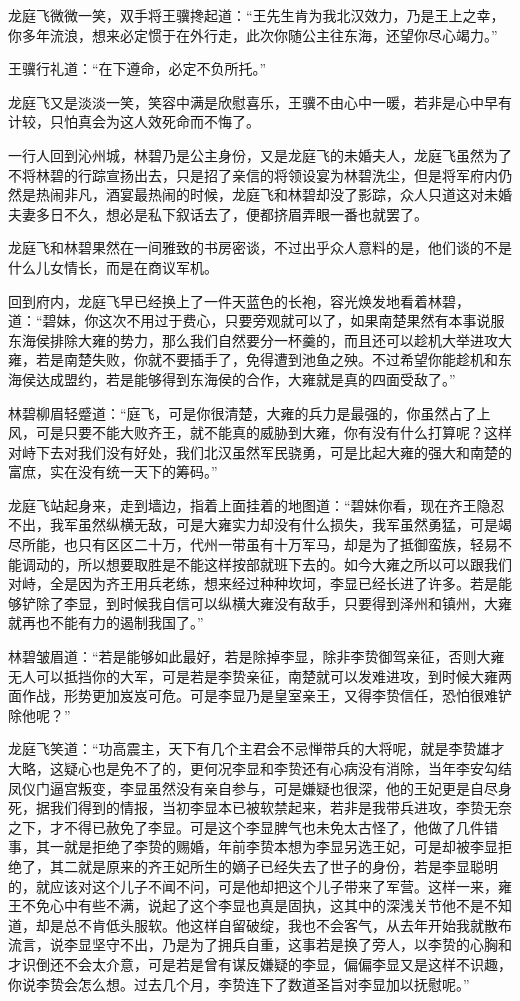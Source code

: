 龙庭飞微微一笑，双手将王骥搀起道：“王先生肯为我北汉效力，乃是王上之幸，你多年流浪，想来必定惯于在外行走，此次你随公主往东海，还望你尽心竭力。”

王骥行礼道：“在下遵命，必定不负所托。”

龙庭飞又是淡淡一笑，笑容中满是欣慰喜乐，王骥不由心中一暖，若非是心中早有计较，只怕真会为这人效死命而不悔了。

一行人回到沁州城，林碧乃是公主身份，又是龙庭飞的未婚夫人，龙庭飞虽然为了不将林碧的行踪宣扬出去，只是招了亲信的将领设宴为林碧洗尘，但是将军府内仍然是热闹非凡，酒宴最热闹的时候，龙庭飞和林碧却没了影踪，众人只道这对未婚夫妻多日不久，想必是私下叙话去了，便都挤眉弄眼一番也就罢了。

龙庭飞和林碧果然在一间雅致的书房密谈，不过出乎众人意料的是，他们谈的不是什么儿女情长，而是在商议军机。

回到府内，龙庭飞早已经换上了一件天蓝色的长袍，容光焕发地看着林碧，道：“碧妹，你这次不用过于费心，只要旁观就可以了，如果南楚果然有本事说服东海侯排除大雍的势力，那么我们自然要分一杯羹的，而且还可以趁机大举进攻大雍，若是南楚失败，你就不要插手了，免得遭到池鱼之殃。不过希望你能趁机和东海侯达成盟约，若是能够得到东海侯的合作，大雍就是真的四面受敌了。”

林碧柳眉轻蹙道：“庭飞，可是你很清楚，大雍的兵力是最强的，你虽然占了上风，可是只要不能大败齐王，就不能真的威胁到大雍，你有没有什么打算呢？这样对峙下去对我们没有好处，我们北汉虽然军民骁勇，可是比起大雍的强大和南楚的富庶，实在没有统一天下的筹码。”

龙庭飞站起身来，走到墙边，指着上面挂着的地图道：“碧妹你看，现在齐王隐忍不出，我军虽然纵横无敌，可是大雍实力却没有什么损失，我军虽然勇猛，可是竭尽所能，也只有区区二十万，代州一带虽有十万军马，却是为了抵御蛮族，轻易不能调动的，所以想要取胜是不能这样按部就班下去的。如今大雍之所以可以跟我们对峙，全是因为齐王用兵老练，想来经过种种坎坷，李显已经长进了许多。若是能够铲除了李显，到时候我自信可以纵横大雍没有敌手，只要得到泽州和镇州，大雍就再也不能有力的遏制我国了。”

林碧皱眉道：“若是能够如此最好，若是除掉李显，除非李贽御驾亲征，否则大雍无人可以抵挡你的大军，可是若是李贽亲征，南楚就可以发难进攻，到时候大雍两面作战，形势更加岌岌可危。可是李显乃是皇室亲王，又得李贽信任，恐怕很难铲除他呢？”

龙庭飞笑道：“功高震主，天下有几个主君会不忌惮带兵的大将呢，就是李贽雄才大略，这疑心也是免不了的，更何况李显和李贽还有心病没有消除，当年李安勾结凤仪门逼宫叛变，李显虽然没有亲自参与，可是嫌疑也很深，他的王妃更是自尽身死，据我们得到的情报，当初李显本已被软禁起来，若非是我带兵进攻，李贽无奈之下，才不得已赦免了李显。可是这个李显脾气也未免太古怪了，他做了几件错事，其一就是拒绝了李贽的赐婚，年前李贽本想为李显另选王妃，可是却被李显拒绝了，其二就是原来的齐王妃所生的嫡子已经失去了世子的身份，若是李显聪明的，就应该对这个儿子不闻不问，可是他却把这个儿子带来了军营。这样一来，雍王不免心中有些不满，说起了这个李显也真是固执，这其中的深浅关节他不是不知道，却是总不肯低头服软。他这样自留破绽，我也不会客气，从去年开始我就散布流言，说李显坚守不出，乃是为了拥兵自重，这事若是换了旁人，以李贽的心胸和才识倒还不会太介意，可是若是曾有谋反嫌疑的李显，偏偏李显又是这样不识趣，你说李贽会怎么想。过去几个月，李贽连下了数道圣旨对李显加以抚慰呢。”

